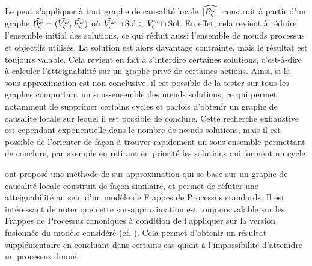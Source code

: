 \begin{remark}
\label{subsetsolution}
  Le  peut s'appliquer à tout graphe de causalité locale
  $\widehat{\lceil \mathcal{B}_\varsigma^\omega\rceil}$
  construit à partir d'un graphe $\widehat{\mathcal{B}^\omega_\varsigma} = (\widehat{V_\varsigma^\omega}, \widehat{E_\varsigma^\omega})$
  où $\widehat{V_\varsigma^\omega} \cap \mathrm{Sol} \subset V_\varsigma^\omega \cap \mathrm{Sol}$.
  En effet, cela revient à réduire l'ensemble initial des solutions,
  ce qui réduit aussi l'ensemble de nœuds processus et objectifs utilisés.
  La solution est alors davantage contrainte, mais le résultat est toujours valable.
  Cela revient en fait à s'interdire certaines solutions,
  c'est-à-dire à calculer l'atteignabilité sur un graphe privé de certaines actions.
  Ainsi, si la sous-approximation est non-conclusive, il est possible de la tester
  sur tous les graphes comportant un sous-ensemble des nœuds solutions,
  ce qui permet notamment de supprimer certains cycles
  et parfois d'obtenir un graphe de causalité locale sur lequel il est possible de conclure.
  Cette recherche exhaustive est cependant exponentielle dans le nombre de nœuds solutions,
  mais il est possible de l'orienter de façon à trouver rapidement un sous-ensemble permettant
  de conclure,
  par exemple en retirant en priorité les solutions qui forment un cycle.
\end{remark}



\begin{remark}
   ont proposé une méthode de sur-approximation qui se base sur
  un graphe de causalité locale construit de façon similaire,
  et permet de réfuter une atteignabilité au sein d'un modèle de
  Frappes de Processus standards.
  Il est intéressant de noter que cette sur-approximation
  est toujours valable sur les Frappes de Processus canoniques à condition de l'appliquer
  sur la version fusionnée du modèle considéré (cf. ).
  Cela permet d'obtenir un résultat supplémentaire en concluant
  dans certains cas quant à l'impossibilité d'atteindre un processus donné.
\end{remark}



